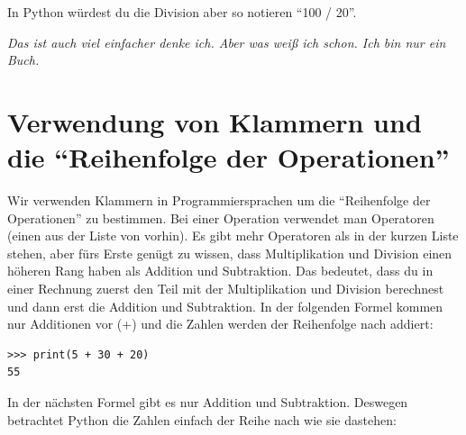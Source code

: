In Python würdest du die Division aber so notieren ``100 / 20''.

\emph{Das ist auch viel einfacher denke ich. Aber was weiß ich schon. Ich bin nur ein Buch.}

\section{Verwendung von Klammern und die ``Reihenfolge der Operationen''}

Wir verwenden Klammern in Programmiersprachen um die ``Reihenfolge der Operationen'' zu bestimmen. Bei einer Operation verwendet man Operatoren (einen aus der Liste von vorhin). Es gibt mehr Operatoren als in der kurzen Liste stehen, aber fürs Erste genügt zu wissen, dass Multiplikation und Division einen höheren Rang haben als Addition und Subtraktion. Das bedeutet, dass du in einer Rechnung zuerst den Teil mit der Multiplikation und Division berechnest und dann erst die Addition und Subtraktion. In der folgenden Formel kommen nur Additionen vor (+) und die Zahlen werden der Reihenfolge nach addiert:

\begin{Verbatim}[frame=single]
>>> print(5 + 30 + 20)
55
\end{Verbatim}

\noindent
In der nächsten Formel gibt es nur Addition und Subtraktion. Deswegen betrachtet Python die Zahlen einfach der Reihe nach wie sie dastehen:

